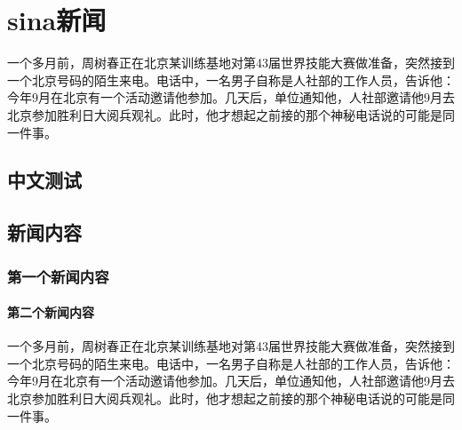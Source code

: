 
\chapter{sina新闻}
一个多月前，周树春正在北京某训练基地对第43届世界技能大赛做准备，突然接到一个北京号码的陌生来电。电话中，一名男子自称是人社部的工作人员，告诉他：今年9月在北京有一个活动邀请他参加。几天后，单位通知他，人社部邀请他9月去北京参加胜利日大阅兵观礼。此时，他才想起之前接的那个神秘电话说的可能是同一件事。
\section{中文测试}
\pkuthssffaq
\section{新闻内容}
\subsection{第一个新闻内容}
\subsubsection{第二个新闻内容}
一个多月前，周树春正在北京某训练基地对第43届世界技能大赛做准备，突然接到一个北京号码的陌生来电。电话中，一名男子自称是人社部的工作人员，告诉他：今年9月在北京有一个活动邀请他参加。几天后，单位通知他，人社部邀请他9月去北京参加胜利日大阅兵观礼。此时，他才想起之前接的那个神秘电话说的可能是同一件事。

